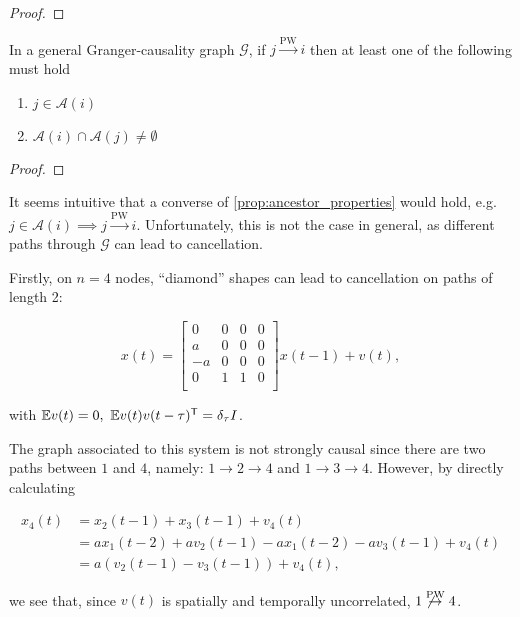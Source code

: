 \documentclass[12pt]{article}
\def\pwgc{\overset{\text{PW}}{\rightarrow}}  %
\def\gcg{\mathcal{G}}  %
\def\B{\mathsf{B}}  %
\def\wtB{\widetilde{\B}}  %
\newcommand{\pa}[1]{pa(#1)}  %
\newcommand{\anc}[1]{\mathcal{A}(#1)}  %
\begin{document}
\begin{proof}

\end{proof}

\begin{proposition}
  \label{prop:ancestor_properties}
  In a general Granger-causality graph $\gcg$, if $j \pwgc i$ then at
  least one of the following must hold

  \begin{enumerate}
    \item{$j \in \anc{i}$}
    \item{$\anc{i} \cap \anc{j} \ne \emptyset$}
  \end{enumerate}
\end{proposition}
\begin{proof}
\end{proof}

It seems intuitive that a converse of \ref{prop:ancestor_properties}
would hold, e.g. $j \in \anc{i} \implies j \pwgc i$.  Unfortunately,
this is not the case in general, as different paths through $\gcg$ can
lead to cancellation.

\begin{example}
  Firstly, on $n = 4$ nodes, ``diamond'' shapes can lead to cancellation on paths of length 2:

\begin{equation*}
  x(t) =
  \left[
    \begin{array}{cccc}
      0 & 0 & 0 & 0\\
      a & 0 & 0 & 0\\
      -a & 0 & 0 & 0\\
      0 & 1 & 1 & 0\\
    \end{array}
  \right] x(t - 1) + v(t),
\end{equation*}

with $\mathbb{E} v(t) = 0,\ \mathbb{E} v(t)v(t - \tau)^{\mathsf{T}} = \delta_\tau I$.

The graph associated to this system is not strongly causal since there are two paths between $1$ and $4$, namely: $1 \rightarrow 2 \rightarrow 4$ and $1 \rightarrow 3 \rightarrow 4$.  However, by directly calculating

\begin{align*}
  x_4(t) &= x_2(t - 1) + x_3(t - 1) + v_4(t)\\
         &= ax_1(t - 2) + av_2(t - 1) - ax_1(t - 2) -av_3(t - 1) + v_4(t)\\
         &= a(v_2(t - 1) - v_3(t - 1)) + v_4(t),
\end{align*}

we see that, since $v(t)$ is spatially and temporally uncorrelated, $1 \not\pwgc 4$.
\end{example}
\end{document}
